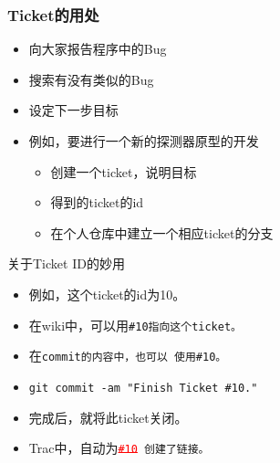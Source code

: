\begin{frame}
    \frametitle{Ticket的用处}
    \begin{itemize}    
        \item 向大家报告程序中的Bug
        \item 搜索有没有类似的Bug
        \item 设定下一步目标
        \item 例如，要进行一个新的探测器原型的开发
            \begin{itemize}
                \item 创建一个ticket，说明目标
                \item 得到的ticket的id
                \item 在个人仓库中建立一个相应ticket的分支
            \end{itemize}
    \end{itemize}
    \begin{block}{关于Ticket ID的妙用}
    \begin{itemize}    
        \item 例如，这个ticket的id为10。
        \item 在wiki中，可以用\tt{\#10}指向这个ticket。
        \item 在\tt{commit}的内容中，也可以
              使用\tt{\#10}。
        \item \tt{\scriptsize{git commit -am "Finish Ticket \#10."}}
        \item 完成后，就将此ticket关闭。
        \item Trac中，自动为\tt\textcolor{red}{{\sout{\#10}}} 创建了链接。
    \end{itemize}
    \end{block}
\end{frame}


